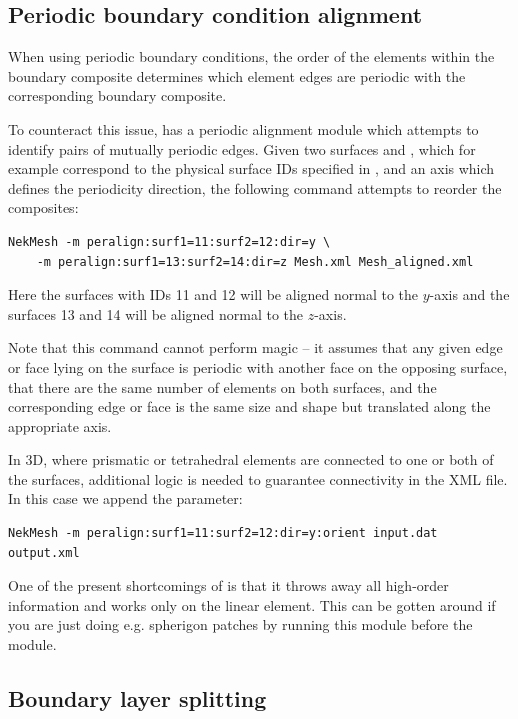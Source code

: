 \subsection{Periodic boundary condition alignment}

When using periodic boundary conditions, the order of the elements within the
boundary composite determines which element edges are periodic with the
corresponding boundary composite.

To counteract this issue, \mc has a periodic alignment module which attempts to
identify pairs of mutually periodic edges. Given two surfaces  and
, which for example correspond to the physical surface IDs
specified in \gmsh, and an axis which defines the periodicity direction, the
following command attempts to reorder the composites:
%
\begin{lstlisting}[style=BashInputStyle]
NekMesh -m peralign:surf1=11:surf2=12:dir=y \
    -m peralign:surf1=13:surf2=14:dir=z Mesh.xml Mesh_aligned.xml
\end{lstlisting}
%
Here the surfaces with IDs 11 and 12 will be aligned normal to the $y$-axis and
the surfaces 13 and 14 will be aligned normal to the $z$-axis.

Note that this command cannot perform magic -- it assumes that any given edge or
face lying on the surface is periodic with another face on the opposing surface,
that there are the same number of elements on both surfaces, and the
corresponding edge or face is the same size and shape but translated along the
appropriate axis.

In 3D, where prismatic or tetrahedral elements are connected to one or both of
the surfaces, additional logic is needed to guarantee connectivity in the XML
file. In this case we append the \inltt{orient} parameter:
%
\begin{lstlisting}[style=BashInputStyle]
NekMesh -m peralign:surf1=11:surf2=12:dir=y:orient input.dat output.xml
\end{lstlisting}

\begin{notebox}
  One of the present shortcomings of  is that it throws away all
  high-order information and works only on the linear element. This can be
  gotten around if you are just doing e.g. spherigon patches by running this
  \inltt{peralign} module before the \inltt{spherigon} module.
\end{notebox}

\subsection{Boundary layer splitting}


